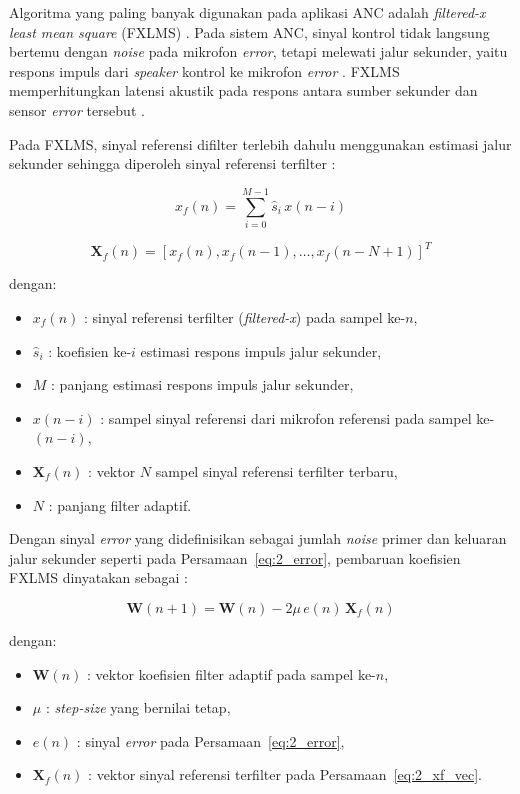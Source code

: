 Algoritma yang paling banyak digunakan pada aplikasi ANC adalah \emph{filtered-x least mean square} (FXLMS) \parencite{klemd2021}. Pada sistem ANC, sinyal kontrol tidak langsung bertemu dengan \emph{noise} pada mikrofon \emph{error}, tetapi melewati jalur sekunder, yaitu respons impuls dari \emph{speaker} kontrol ke mikrofon \emph{error} \parencite{sarkar2025,chen2025}. FXLMS memperhitungkan latensi akustik pada respons antara sumber sekunder dan sensor \emph{error} tersebut \parencite{shi2023anc}.

Pada FXLMS, sinyal referensi difilter terlebih dahulu menggunakan estimasi jalur sekunder sehingga diperoleh sinyal referensi terfilter \parencite{zhangrs2023,sarkar2025}:

\begin{equation}
  \label{eq:2_xf}
  x_f(n) = \sum_{i=0}^{M-1} \hat{s}_i\, x(n-i)
\end{equation}

\begin{equation}
  \label{eq:2_xf_vec}
  \mathbf{X}_f(n) = \left[x_f(n), x_f(n-1), \ldots, x_f(n-N+1)\right]^T
\end{equation}

dengan:
\begin{itemize}[noitemsep, topsep=2pt]
  \item $x_f(n)$ : sinyal referensi terfilter (\emph{filtered-x}) pada sampel ke-$n$,
  \item $\hat{s}_i$ : koefisien ke-$i$ estimasi respons impuls jalur sekunder,
  \item $M$ : panjang estimasi respons impuls jalur sekunder,
  \item $x(n-i)$ : sampel sinyal referensi dari mikrofon referensi pada sampel ke-$(n-i)$,
  \item $\mathbf{X}_f(n)$ : vektor $N$ sampel sinyal referensi terfilter terbaru,
  \item $N$ : panjang filter adaptif.
\end{itemize}

Dengan sinyal \emph{error} yang didefinisikan sebagai jumlah \emph{noise} primer dan keluaran jalur sekunder seperti pada Persamaan~\eqref{eq:2_error}, pembaruan koefisien FXLMS dinyatakan sebagai \parencite{zhangrs2023}:

\begin{equation}
  \label{eq:2_fxlms}
  \mathbf{W}(n+1) = \mathbf{W}(n) - 2\mu\,e(n)\,\mathbf{X}_f(n)
\end{equation}

dengan:
\begin{itemize}[noitemsep, topsep=2pt]
  \item $\mathbf{W}(n)$ : vektor koefisien filter adaptif pada sampel ke-$n$,
  \item $\mu$ : \emph{step-size} yang bernilai tetap,
  \item $e(n)$ : sinyal \emph{error} pada Persamaan~\eqref{eq:2_error},
  \item $\mathbf{X}_f(n)$ : vektor sinyal referensi terfilter pada Persamaan~\eqref{eq:2_xf_vec}.
\end{itemize}

